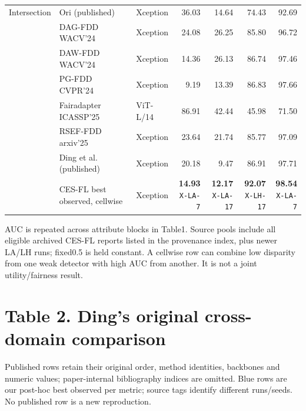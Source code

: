 \documentclass[10pt]{article}
\newcommand{\note}[1]{{\fontsize{8}{10}\selectfont #1\par}}
\begin{document}
{\begin{tabular*}{\linewidth}{@{\extracolsep{\fill}}lllrrrr}
\midrule
Intersection & Ori (published) & Xception & 36.03 & 14.64 & 74.43 & 92.69\\
 & DAG-FDD WACV'24 & Xception & 24.08 & 26.25 & 85.80 & 96.72\\
 & DAW-FDD WACV'24 & Xception & 14.36 & 26.13 & 86.74 & 97.46\\
 & PG-FDD CVPR'24 & Xception & 9.19 & 13.39 & 86.83 & 97.66\\
 & Fairadapter ICASSP'25 & ViT-L/14 & 86.91 & 42.44 & 45.98 & 71.50\\
 & RSEF-FDD arxiv'25 & Xception & 23.64 & 21.74 & 85.77 & 97.09\\
 & Ding et al. (published) & Xception & 20.18 & 9.47 & 86.91 & 97.71\\
\rowcolor{blue!8} & CES-FL best observed, cellwise & Xception & \shortstack{\textbf{14.93}\\{\tiny\texttt{X-LA-7}}} & \shortstack{\textbf{12.17}\\{\tiny\texttt{X-LA-17}}} & \shortstack{\textbf{92.07}\\{\tiny\texttt{X-LH-17}}} & \shortstack{\textbf{98.54}\\{\tiny\texttt{X-LA-7}}}\\
\bottomrule\end{tabular*}}\par
\note{AUC is repeated across attribute blocks in Table1. Source pools include all eligible archived CES-FL reports listed in the provenance index, plus newer LA/LH runs; fixed0.5 is held constant. A cellwise row can combine low disparity from one weak detector with high AUC from another. It is not a joint utility/fairness result.}
\clearpage\section*{Table 2. Ding's original cross-domain comparison}
\note{Published rows retain their original order, method identities, backbones and numeric values; paper-internal bibliography indices are omitted. Blue rows are our post-hoc best observed per metric; source tags identify different runs/seeds. No published row is a new reproduction.}
\end{document}
